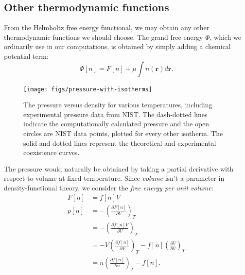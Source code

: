\documentclass[letterpaper,twocolumn,amsmath,amssymb,prb]{revtex4-1}
\newcommand{\xx}{\textbf{r}}
\begin{document}
\subsection{Other thermodynamic functions}

From the Helmholtz free energy functional, we may obtain any other
thermodynamic functions we should choose.  The grand free energy
$\Phi$, which we ordinarily use in our computations, is obtained by
simply adding a chemical potential term:
\begin{equation}
  \Phi[n] = F[n] + \mu \int n(\xx) d\xx.
\end{equation}

\begin{figure}
\begin{center}
\texttt{[image: figs/pressure-with-isotherms]}
\end{center}
\caption{The pressure versus density for various temperatures, including
experimental pressure data from NIST\cite{nistwater}. The dash-dotted lines
indicate the computationally calculated pressure and the open circles are 
NIST data points, plotted for every other isotherm. The solid and dotted lines
represent the theoretical and experimental coexistence curves.}
\label{fig:pressure-with-isotherms}
\end{figure}

The pressure would naturally be obtained by taking a partial
derivative with respect to volume at fixed temperature.  Since
\emph{volume} isn't a parameter in density-functional theory, we
consider the \emph{free energy per unit volume}:
\begin{align}
  F[n] &= f[n]V \\
  p[n] &= -\left(\frac{\partial F[n]}{\partial V}\right)_{T} \\
  &= -\left(\frac{\partial f[n]V}{\partial V}\right)_{T} \\
  &= -V\left(\frac{\partial f[n]}{\partial V}\right)_{T}
   - f[n]\left(\frac{\partial V}{\partial V}\right)_{T} \\
  &= n \left(\frac{\partial f[n]}{\partial n}\right)_{T} - f[n].
\end{align}
\end{document}
